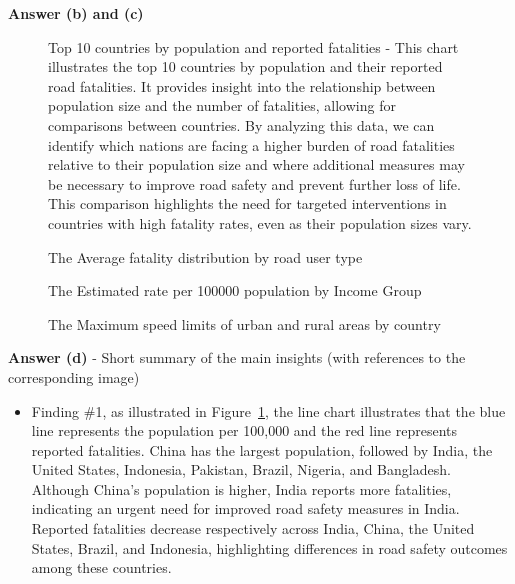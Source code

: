\documentclass[a4paper,10pt]{article}\setlength{\textheight}{10in}\setlength{\textwidth}{6.5in}\setlength{\topmargin}{-0.125in}\setlength{\oddsidemargin}{-.2in}\setlength{\evensidemargin}{-.2in}\setlength{\headsep}{0.2in}\setlength{\footskip}{0pt}\usepackage{amsmath}\usepackage{fancyhdr}\usepackage{enumitem}\usepackage{hyperref}\usepackage{xcolor}\usepackage{graphicx}\usepackage[export]{adjustbox}\usepackage{caption}\usepackage{float}\usepackage{booktabs}\usepackage{makecell}\pagestyle{fancy}
\begin{document}
\begin{enumerate}[topsep=0mm, partopsep=0mm, leftmargin=*]
    
\textbf{Answer (b) and (c)}
    \begin{figure}[H]
        \centering
        \caption{Top 10 countries by population and reported fatalities - This chart illustrates the top 10 countries by population and their reported road fatalities. It provides insight into the relationship between population size and the number of fatalities, allowing for comparisons between countries. By analyzing this data, we can identify which nations are facing a higher burden of road fatalities relative to their population size and where additional measures may be necessary to improve road safety and prevent further loss of life. This comparison highlights the need for targeted interventions in countries with high fatality rates, even as their population sizes vary. }
        \label{fig:plot1}
    \end{figure}
    \begin{figure}[H]
        \centering
        \caption{The Average fatality distribution by road user type}
        \label{fig:plot2}
    \end{figure}
    \begin{figure}[H]
        \centering
        \caption{The Estimated rate per 100000 population by Income Group}
        \label{fig:plot3}
    \end{figure}
    \begin{figure}[H]
        \centering
        \caption{The Maximum speed limits of urban and rural areas by country}
        \label{fig:plot4}
    \end{figure}

\textbf{Answer (d)} - Short summary of the main insights (with references to the corresponding image)
    \begin{itemize}
        \item Finding \#1, as illustrated in Figure~\ref{fig:plot1}, the line chart illustrates that the blue line represents the population per 100,000 and the red line represents reported fatalities. China has the largest population, followed by India, the United States, Indonesia, Pakistan, Brazil, Nigeria, and Bangladesh. Although China's population is higher, India reports more fatalities, indicating an urgent need for improved road safety measures in India. Reported fatalities decrease respectively across India, China, the United States, Brazil, and Indonesia, highlighting differences in road safety outcomes among these countries.


\end{itemize}
\end{enumerate}
\end{document}
